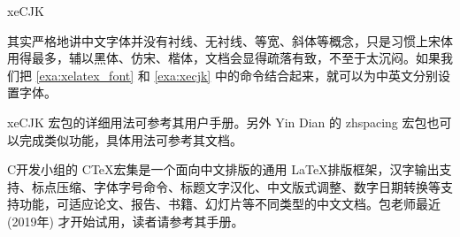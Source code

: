 \begin{example}[h]
\begin{Code}[numbers=left]
\usepackage[CJKchecksingle,CJKnumber]{xeCJK}
\end{Code}
\caption{xeCJK}
\label{exa:xecjk}
\end{example}

其实严格地讲中文字体并没有衬线、无衬线、等宽、斜体等概念，只是习惯上宋体用得最多，辅以黑体、仿宋、楷体，文档会显得疏落有致，不至于太沉闷。如果我们把 \autoref{exa:xelatex_font} 和 \autoref{exa:xecjk} 中的命令结合起来，就可以为中英文分别设置字体。

xeCJK 宏包的详细用法可参考其用户手册\citep{Sun_xecjk}。另外 Yin Dian 的 zhspacing 宏包也可以完成类似功能，具体用法可参考其文档\citep{Yin_zhspacing}。

C\Tex 开发小组的 C\TeX 宏集是一个面向中文排版的通用 \LaTeX 排版框架，汉字输出支持、标点压缩、字体字号命令、标题文字汉化、中文版式调整、数字日期转换等支持功能，可适应论文、报告、书籍、幻灯片等不同类型的中文文档。包老师最近 (2019年) 才开始试用，读者请参考其手册\citep{CTeX_ctex}。



